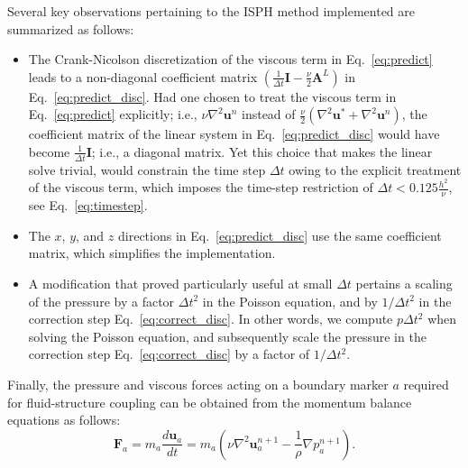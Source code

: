 Several key observations pertaining to the ISPH method implemented are summarized as follows:
\begin{itemize}
	\item The Crank-Nicolson discretization of the viscous term in Eq.~\ref{eq:predict} leads to a non-diagonal coefficient matrix $(\frac{1}{\Delta t} \mathbf{I}-\frac{\nu}{2} \mathbf{A}^L)$ in Eq.~\ref{eq:predict_disc}. Had one chosen to treat the viscous term in Eq.~\ref{eq:predict} explicitly; i.e., $\nu \nabla^2\mathbf{u}^n$ instead of $\frac{\nu}{2}(\nabla^2\mathbf{u}^* +\nabla^2\mathbf{u}^n)$, the coefficient matrix of the linear system in Eq.~\ref{eq:predict_disc} would have become $\frac{1}{\Delta t} \mathbf{I}$; i.e., a diagonal matrix. Yet this choice that makes the linear solve trivial, would constrain the time step $\Delta t$ owing to the explicit treatment of the viscous term, which imposes the time-step restriction of $\Delta t < 0.125 \frac{h^2}{\nu}$, see Eq.~\ref{eq:timestep}. 
	
	\item The $x$, $y$, and $z$ directions in Eq.~\ref{eq:predict_disc} use the same coefficient matrix, which simplifies the implementation. 
	
	\item A modification that proved particularly useful at small $\Delta t$ pertains a scaling of the pressure by a factor  $\Delta t^2$ in the Poisson equation, and by $1/\Delta t^2$ in the correction step Eq.~\ref{eq:correct_disc}. In other words, we compute $p\Delta t^2$ when solving the Poisson equation, and subsequently scale the pressure in the correction step Eq.~\ref{eq:correct_disc} by a factor of $1/\Delta t^2$.
\end{itemize} 

Finally, the pressure and viscous forces acting on a boundary marker $a$ required for fluid-structure coupling can be obtained from the momentum balance equations as follows:
\begin{equation}\label{eq:FS_ISPH}
\mathbf{F}_a=m_a \dfrac{d\mathbf{u}_a}{d t}=m_a (\nu \nabla^2\mathbf{u}_a^{n+1} -\dfrac{1}{\rho} \nabla p_a^{n+1}).
\end{equation}
